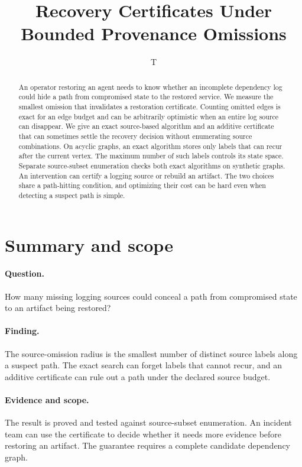 \documentclass[11pt]{article}
\title{Recovery Certificates Under Bounded Provenance Omissions}
\author{T}
\date{}
\begin{document}
\maketitle
\begin{abstract}
An operator restoring an agent needs to know whether an incomplete
dependency log could hide a path from compromised state to the
restored service. We measure the smallest omission that invalidates
a restoration certificate. Counting omitted edges is exact for an
edge budget and can be arbitrarily optimistic when an entire log
source can disappear. We give an exact source-based algorithm and
an additive certificate that can sometimes settle the recovery decision
without enumerating source combinations. On acyclic graphs, an exact
algorithm stores only labels that can recur after the current vertex.
The maximum number of such labels controls its state space. Separate
source-subset enumeration checks both exact algorithms on synthetic graphs.
An intervention can certify a logging source or rebuild an artifact.
The two choices share a path-hitting condition, and optimizing their
cost can be hard even when detecting a suspect path is simple.
\end{abstract}

\section*{Summary and scope}
\paragraph{Question.} How many missing logging sources could conceal a
path from compromised state to an artifact being restored?
\paragraph{Finding.} The source-omission radius is the smallest number of
distinct source labels along a suspect path. The exact search can
forget labels that cannot recur, and an additive certificate can rule
out a path under the declared source budget.
\paragraph{Evidence and scope.} The result is proved and tested
against source-subset enumeration. An incident team can use the
certificate to decide whether it needs more evidence before restoring an
artifact. The guarantee requires a complete candidate dependency graph.
\end{document}
